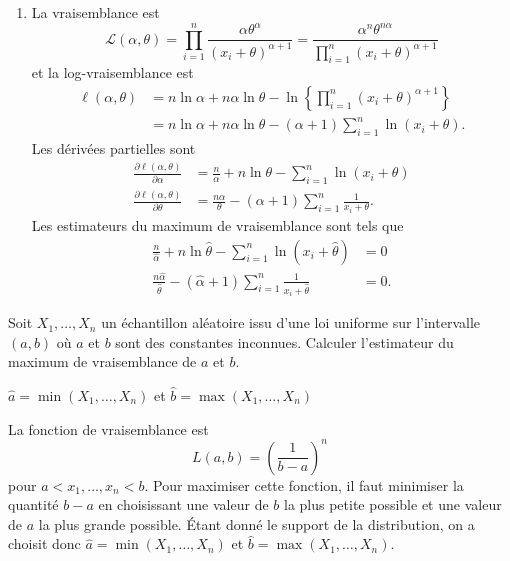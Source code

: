 \begin{exercice}
\begin{sol}
\begin{enumerate}
\item La vraisemblance est
$$
\mathcal{L}(\alpha,\theta)=\prod_{i=1}^n\frac{\alpha\theta^\alpha}{(x_i+\theta)^{\alpha+1}}=\frac{\alpha^n\theta^{n\alpha}}{\prod_{i=1}^n(x_i+\theta)^{\alpha+1}}
$$
et la log-vraisemblance est
\begin{align*}
\ell(\alpha,\theta)&=n\ln \alpha+n\alpha\ln \theta-\ln\left\{\prod_{i=1}^n(x_i+\theta)^{\alpha+1}\right\}\\
&=n\ln \alpha+n\alpha\ln \theta-(\alpha+1)\sum_{i=1}^n\ln(x_i+\theta).
\end{align*}
Les dérivées partielles sont
\begin{align*}
\frac{\partial\ell(\alpha,\theta)}{\partial \alpha}&=\frac{n}{ \alpha}+n\ln \theta-\sum_{i=1}^n\ln(x_i+\theta)\\
\frac{\partial\ell(\alpha,\theta)}{\partial \theta}&=\frac{n\alpha}{ \theta}-(\alpha+1)\sum_{i=1}^n\frac{1}{x_i+\theta}.
\end{align*}
Les estimateurs du maximum de vraisemblance sont tels que
\begin{align*}
\frac{n}{\hat\alpha}+n\ln \hat\theta-\sum_{i=1}^n\ln(x_i+\hat\theta)&=0\\
\frac{n\hat\alpha}{ \hat\theta}-(\hat\alpha+1)\sum_{i=1}^n\frac{1}{x_i+\hat\theta}&=0.
\end{align*}
\end{enumerate}
\end{sol}
\end{exercice}

\begin{exercice}
  Soit $X_1, \dots, X_n$ un échantillon aléatoire issu d'une loi
  uniforme sur l'intervalle $(a, b)$ où $a$ et $b$ sont des constantes
  inconnues. Calculer l'estimateur du maximum de vraisemblance de $a$
  et $b$.
  \begin{rep}
    $\hat{a} = \min(X_1, \dots, X_n)$ et $\hat{b} = \max(X_1, \dots,
    X_n)$
  \end{rep}
  \begin{sol}
    La fonction de vraisemblance est
    \begin{equation*}
      L(a, b) = \left( \frac{1}{b - a} \right)^n
    \end{equation*}
    pour $a < x_1, \dots, x_n < b$. Pour maximiser cette fonction, il
    faut minimiser la quantité $b - a$ en choisissant une valeur de
    $b$ la plus petite possible et une valeur de $a$ la plus grande
    possible. Étant donné le support de la distribution, on a choisit
    donc $\hat{a} = \min(X_1, \dots, X_n)$ et $\hat{b} = \max(X_1,
    \dots, X_n)$.
  \end{sol}
\end{exercice}

